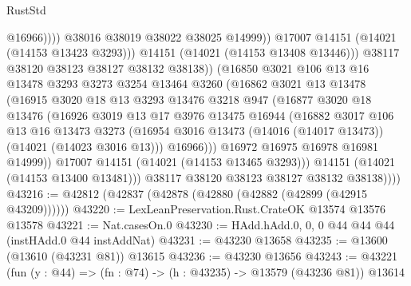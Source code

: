 \begin{lexlean}{RustStd}
\begin{coremodule}
                                  @16966))))
                          @38016
                          @38019
                          @38022
                          @38025
                          @14999))
                      @17007
                      @14151
                      (@14021 (@14153 @13423 @3293)))
                    @14151
                    (@14021 (@14153 @13408 @13446)))
                  @38117
                  @38120
                  @38123
                  @38127
                  @38132
                  @38138))
              (@16850
                @3021
                @106
                @13
                @16
                @13478
                @3293
                @3273
                @3254
                @13464
                @3260
                (@16862
                  @3021
                  @13
                  @13478
                  (@16915
                    @3020
                    @18
                    @13
                    @3293
                    @13476
                    @3218
                    @947
                    (@16877
                      @3020
                      @18
                      @13476
                      (@16926
                        @3019
                        @13
                        @17
                        @3976
                        @13475
                        @16944
                        (@16882
                          @3017
                          @106
                          @13
                          @16
                          @13473
                          @3273
                          (@16954 @3016 @13473 (@14016 (@14017 @13473)) (@14021 (@14023 @3016 @13)))
                          @16966)))
                    @16972
                    @16975
                    @16978
                    @16981
                    @14999))
                @17007
                @14151
                (@14021 (@14153 @13465 @3293)))
              @14151
              (@14021 (@14153 @13400 @13481)))
            @38117
            @38120
            @38123
            @38127
            @38132
            @38138))))
@43216 := @42812 (@42837 (@42878 (@42880 (@42882 (@42899 (@42915 @43209))))))
@43220 := LexLeanPreservation.Rust.CrateOK @13574 @13576 @13578
@43221 := Nat.casesOn.{0}
@43230 := HAdd.hAdd.{0, 0, 0} @44 @44 @44 (instHAdd.{0} @44 instAddNat)
@43231 := @43230 @13658
@43235 := @13600 (@13610 (@43231 @81)) @13615
@43236 := @43230 @13656
@43243 := @43221 (fun (y : @44) => (fn : @74) -> (h : @43235) -> @13579 (@43236 @81)) @13614

\end{coremodule}
\end{lexlean}
